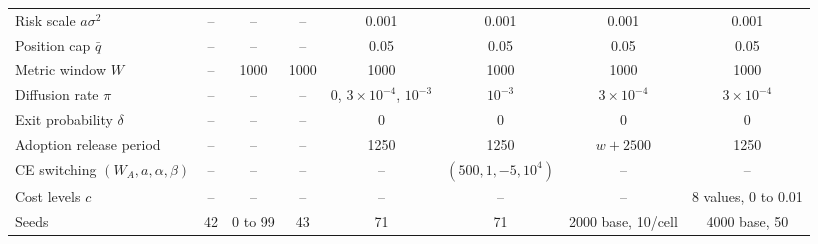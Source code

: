 \documentclass[12pt]{article}
\begin{document}
\begin{table}[h]
\begin{tabular}{@{}l c c c c c c c@{}}
Risk scale $a\sigma^{2}$ & -- & -- & -- & 0.001 & 0.001 & 0.001 & 0.001 \\ %
Position cap $\bar{q}$ & -- & -- & -- & 0.05 & 0.05 & 0.05 & 0.05 \\ %
Metric window $W$ & -- & 1000 & 1000 & 1000 & 1000 & 1000 & 1000 \\ %
Diffusion rate $\pi$ & -- & -- & -- & 0, $3{\times}10^{-4}$, $10^{-3}$ & $10^{-3}$ & $3 \times 10^{-4}$ & $3 \times 10^{-4}$ \\ %
Exit probability $\delta$ & -- & -- & -- & 0 & 0 & 0 & 0 \\ %
Adoption release period & -- & -- & -- & 1250 & 1250 & $w + 2500$ & 1250 \\ %
CE switching $(W_A, a, \alpha, \beta)$ & -- & -- & -- & -- & $(500, 1, -5, 10^{4})$ & -- & -- \\ %
Cost levels $c$ & -- & -- & -- & -- & -- & -- & 8 values, 0 to 0.01 \\ %
Seeds & 42 & 0 to 99 & 43 & 71 & 71 & 2000 base, 10/cell & 4000 base, 50 \\ %
\bottomrule
\end{tabular}
\end{table}
\end{document}

